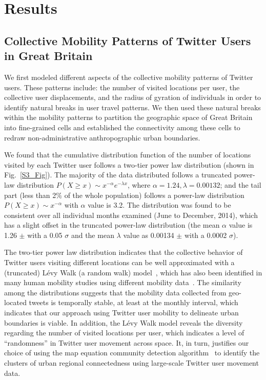 \documentclass[]{tGIS2e}
\begin{document}
{\section{Results}
\subsection{Collective Mobility Patterns of Twitter Users in Great Britain}
We first modeled different aspects of the collective mobility patterns of Twitter users.
These patterns include: the number of visited locations per user,  the collective user displacements, and the radius of gyration of individuals in order to identify natural breaks in user travel patterns.
We then used these natural breaks within the mobility patterns to partition the geographic space of Great Britain into fine-grained cells and established the connectivity among these cells to redraw non-administrative anthropographic urban boundaries. 

We found that the cumulative distribution function of the number of locations visited by each Twitter user follows a two-tier power law distribution (shown in Fig.~\ref{S3_Fig}). 
The majority of the data distributed follows a truncated power-law distribution $P(X\geq x)\sim x^{-\alpha}e^{-\lambda x}$, where $\alpha = 1.24, \lambda =0.00132$; and the tail part (less than 2$\%$ of the whole population) follows a power-law distribution  $P(X \geq x)\sim x^{-\alpha}$ with $\alpha$ value is 3.2.
The distribution was found to be consistent over all individual months examined (June to December, 2014), which has a slight offset in the truncated power-law distribution (the mean $\alpha$ value is 1.26 $ \pm$ with a 0.05 $\sigma$ and the mean $\lambda$ value as 0.00134 $ \pm$  with a 0.0002 $\sigma$). 

The two-tier power law distribution indicates that the collective behavior of Twitter users visiting different locations can be well approximated with a (truncated) L\'{e}vy Walk (a random walk) model~\citep{rhee2011,reynolds2012}, which has also been identified in many human mobility studies using different mobility data~\citep{zhao2015}.
The similarity among the distributions suggests that the mobility data collected from geo-located tweets is temporally stable, at least at the monthly interval, which indicates that our approach using Twitter user mobility to delineate urban boundaries is viable.  
In addition, the L\'{e}vy Walk model reveals the diversity regarding the number of visited locations per user, which indicates a level of ``randomness'' in Twitter user movement across space. 
It, in turn, justifies our choice of using the map equation community detection algorithm~\citep{rosvall2008} to identify the clusters of urban regional connectedness using large-scale Twitter user movement data.


}
\end{document}
